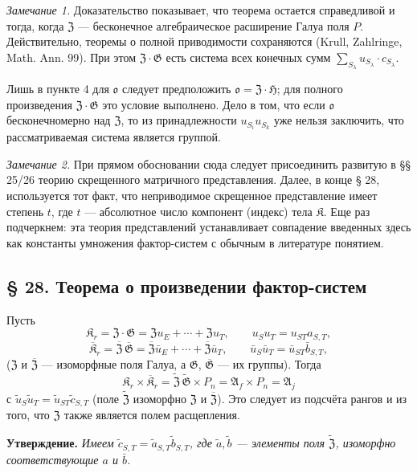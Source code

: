 \documentclass[11pt]{article}
\begin{document}
\noindent\emph{Замечание 1.} Доказательство показывает, что теорема остается справедливой и тогда, когда \(\mathfrak Z\) --- бесконечное алгебраическое расширение Галуа поля \(P\). Действительно, теоремы о полной приводимости сохраняются (Krull, Zahlringe, Math. Ann. 99). При этом \(\mathfrak Z\cdot\mathfrak G\) есть система всех конечных сумм \(\sum_{S_\lambda}u_{S_\lambda}\cdot c_{S_\lambda}\).

Лишь в пункте 4 для \(\mathfrak o\) следует предположить \(\mathfrak o=\mathfrak Z\cdot\mathfrak H\); для полного произведения \(\mathfrak Z\cdot\mathfrak G\) это условие выполнено. Дело в том, что если \(\mathfrak o\) бесконечномерно над \(\mathfrak Z\), то из принадлежности \(u_{S_i}u_{S_k}\) уже нельзя заключить, что рассматриваемая система является группой.

\noindent\emph{Замечание 2.} При прямом обосновании сюда следует присоединить развитую в §§ 25/26 теорию скрещенного матричного представления. Далее, в конце § 28, используется тот факт, что неприводимое скрещенное представление имеет степень \(t\), где \(t\) --- абсолютное число компонент (индекс) тела \(\mathfrak K\). Еще раз подчеркнем: эта теория представлений устанавливает совпадение введенных здесь как константы умножения фактор-систем с обычным в литературе понятием.

\subsection*{§ 28. Теорема о произведении фактор-систем}\label{produktsatz-fuer-faktorensysteme}

Пусть
\[
\mathfrak K_r=\mathfrak Z\cdot\mathfrak G
=\mathfrak Zu_E+\cdots+\mathfrak Zu_T,
\qquad u_Su_T=u_{ST}a_{S,T},
\]
\[
\overline{\mathfrak K}_r
=\overline{\mathfrak Z}\,\overline{\mathfrak G}
=\overline{\mathfrak Z}\bar u_E+\cdots+\overline{\mathfrak Z}\bar u_T,
\qquad
\bar u_S\bar u_T=\bar u_{ST}\bar b_{S,T},
\]
(\(\mathfrak Z\) и \(\overline{\mathfrak Z}\) --- изоморфные поля Галуа, а \(\mathfrak G\), \(\overline{\mathfrak G}\) --- их группы). Тогда
\[
\mathfrak K_r\times\overline{\mathfrak K}_r
=\widetilde{\mathfrak Z}\,\widetilde{\mathfrak G}\times P_n
=\mathfrak A_f\times P_n
=\mathfrak A_j
\]
с \(\tilde u_S\tilde u_T=\tilde u_{ST}\tilde c_{S,T}\) (поле \(\widetilde{\mathfrak Z}\) изоморфно \(\mathfrak Z\) и \(\overline{\mathfrak Z}\)). Это следует из подсчёта рангов и из того, что \(\mathfrak Z\) также является полем расщепления.

\noindent\textbf{Утверждение.} \emph{Имеем \(\tilde c_{S,T}=\tilde a_{S,T}\tilde b_{S,T}\), где \(\tilde a,\tilde b\) --- элементы поля \(\widetilde{\mathfrak Z}\), изоморфно соответствующие \(a\) и \(\bar b\).}
\end{document}
